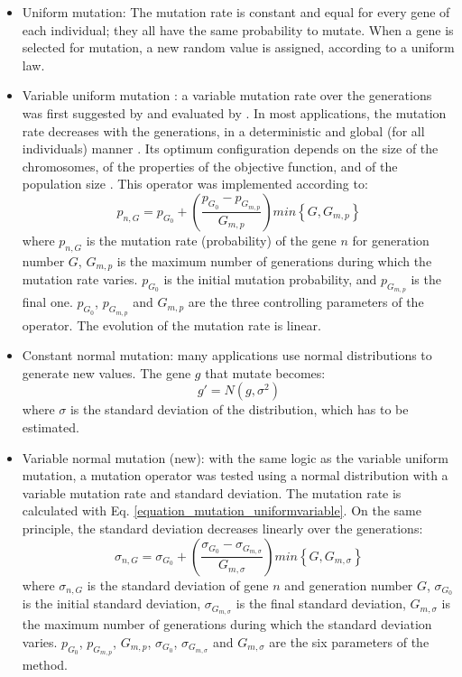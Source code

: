 \documentclass{ametsoc}
\begin{document}
\begin{itemize}
	\item Uniform mutation: The mutation rate is constant and equal for every gene of each individual; they all have the same probability to mutate. When a gene is selected for mutation, a new random value is assigned, according to a uniform law.
	
	\item Variable uniform mutation \citep{Fogarty1989}: a variable mutation rate over the generations was first suggested by \citet{Holland1992b} and evaluated by \citet{Fogarty1989}. In most applications, the mutation rate decreases with the generations, in a deterministic and global (for all individuals) manner \citep{Back1992b}. Its optimum configuration depends on the size of the chromosomes, of the properties of the objective function, and of the population size \citep{Back1992b}. This operator was implemented according to:
	\begin{equation}
	p_{n,G} = p_{G_{0}}+\left( \dfrac{p_{G_{0}}-p_{G_{m,p}}}{G_{m,p}} \right) min\left\lbrace G,G_{m,p}\right\rbrace 
	\label{equation_mutation_uniformvariable}
	\end{equation}
	where $p_{n,G}$ is the mutation rate (probability) of the gene $n$ for generation number $G$, $G_{m,p}$ is the maximum number of generations during which the mutation rate varies. $p_{G_{0}}$ is the initial mutation probability, and $p_{G_{m,p}}$ is the final one. $p_{G_{0}}$, $p_{G_{m,p}}$ and $G_{m,p}$ are the three controlling parameters of the operator. The evolution of the mutation rate is linear.
	
	\item Constant normal mutation: many applications use normal distributions to generate new values. The gene $g$ that mutate becomes:
	\begin{equation}
	g' = N(g,\sigma^{2})
	\label{equation_mutating_normal_distribution}
	\end{equation}
	where $\sigma$ is the standard deviation of the distribution, which has to be estimated.
	
	\item Variable normal mutation (new): with the same logic as the variable uniform mutation, a mutation operator was tested using a normal distribution with a variable mutation rate and standard deviation. The mutation rate is calculated with Eq. \ref{equation_mutation_uniformvariable}. On the same principle, the standard deviation decreases linearly over the generations:
	\begin{equation}
	\sigma_{n,G} = \sigma_{G_{0}}+\left( \dfrac{\sigma_{G_{0}}-\sigma_{G_{m,\sigma}}}{G_{m,\sigma}} \right) min\left\lbrace G,G_{m,\sigma}\right\rbrace 
	\label{equation_mutation_normalvariable}
	\end{equation}
	where $\sigma_{n,G}$ is the standard deviation of gene $n$ and generation number $G$, $\sigma_{G_{0}}$ is the initial standard deviation, $\sigma_{G_{m,\sigma}}$ is the final standard deviation, $G_{m,\sigma}$ is the maximum number of generations during which the standard deviation varies. $p_{G_{0}}$, $p_{G_{m,p}}$, $G_{m,p}$, $\sigma_{G_{0}}$, $\sigma_{G_{m,\sigma}}$ and $G_{m,\sigma}$ are the six parameters of the method.
	

\end{itemize}
\end{document}
